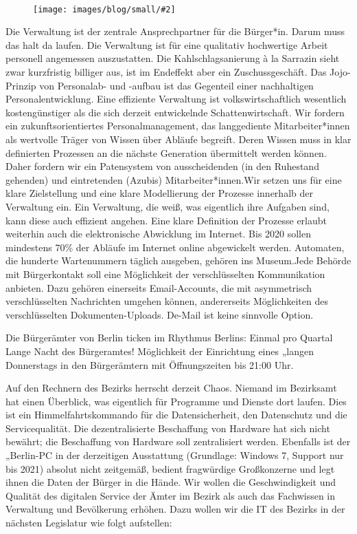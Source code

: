 \documentclass[a4paper,10pt]{article}
\newcommand{\mysection}[1]{{\vspace{1cm}\noindent\color{gray}{\ttfamily\LARGE\raggedright #1}\\\medskip}}
\newcommand{\abschnitt}[2]{%
\mysection{\raggedright #1}%
\begin{figure}[t]%
\vspace*{-2.7cm}%
\hspace*{-2.1cm}%
\texttt{[image: images/blog/small/\#2]} %
\end{figure}%
}
\begin{document}
\clearpage
\abschnitt{Verwaltung}{GefahrengebietTermine.png}

\enlargethispage{2\baselineskip}
Die Verwaltung ist der zentrale Ansprechpartner für die Bürger*in.
Darum muss das halt da laufen. Die Verwaltung ist für eine qualitativ
hochwertige Arbeit personell angemessen auszustatten. Die
Kahlschlagsanierung à la Sarrazin sieht zwar kurzfristig billiger aus,
ist im Endeffekt aber ein Zuschussgeschäft. Das Jojo-Prinzip von
Personalab- und -aufbau ist das Gegenteil einer nachhaltigen
Personalentwicklung. Eine effiziente Verwaltung ist volkswirtschaftlich
wesentlich kostengünstiger als die sich derzeit entwickelnde
Schattenwirtschaft. Wir fordern ein zukunftsorientiertes
Personalmanagement, das langgediente Mitarbeiter*innen als wertvolle
Träger von Wissen über Abläufe begreift. Deren Wissen muss in klar
definierten Prozessen an die nächste Generation übermittelt werden
können. Daher fordern wir ein Patensystem von ausscheidenden (in den
Ruhestand gehenden) und eintretenden (Azubis) Mitarbeiter*innen.Wir
setzen uns für eine klare Zielstellung und eine klare Modellierung der
Prozesse innerhalb der Verwaltung ein. Ein Verwaltung, die weiß, was
eigentlich ihre Aufgaben sind, kann diese auch effizient angehen. Eine
klare Definition der Prozesse erlaubt weiterhin auch die elektronische
Abwicklung im Internet. Bis 2020 sollen mindestens 70\% der Abläufe im
Internet online abgewickelt werden. Automaten, die hunderte Wartenummern
täglich ausgeben, gehören ins Museum.Jede Behörde mit Bürgerkontakt soll
eine Möglichkeit der verschlüsselten Kommunikation anbieten. Dazu
gehören einerseits Email-Accounts, die mit asymmetrisch verschlüsselten
Nachrichten umgehen können, andererseits Möglichkeiten des
verschlüsselten Dokumenten-Uploads. De-Mail ist keine sinnvolle Option.

Die Bürgerämter von Berlin ticken im Rhythmus Berlins: Einmal pro
Quartal Lange Nacht des Bürgeramtes! Möglichkeit der Einrichtung eines
„langen Donnerstags{\grqq} in den Bürgerämtern mit Öffnungszeiten bis 21:00
Uhr.

Auf den Rechnern des Bezirks herrscht derzeit Chaos. Niemand im
Bezirksamt hat einen Überblick, was eigentlich für Programme und Dienste
dort laufen. Dies ist ein Himmelfahrtskommando für die Datensicherheit,
den Datenschutz und die Servicequalität. Die dezentralisierte
Beschaffung von Hardware hat sich nicht bewährt; die Beschaffung von
Hardware soll zentralisiert werden. Ebenfalls ist der „Berlin-PC{\grqq} in
der derzeitigen Ausstattung (Grundlage: Windows 7, Support nur bis 2021)
absolut nicht zeitgemäß, bedient fragwürdige Großkonzerne und legt ihnen
die Daten der Bürger in die Hände. Wir wollen die Geschwindigkeit und
Qualität des digitalen Service der Ämter im Bezirk als auch das
Fachwissen in Verwaltung und Bevölkerung erhöhen. Dazu wollen wir die IT
des Bezirks in der nächsten Legislatur wie folgt aufstellen:
\end{document}
